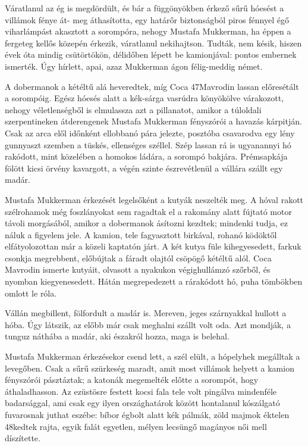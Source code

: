 \documentclass{IEEEtran}
\begin{document}
Váratlanul az ég is megdördült, és bár a függönyökben érkező sűrű hóesést a
villámok fénye át- meg áthasította, egy határőr biztonságból piros fénnyel égő
viharlámpást akasztott a sorompóra, nehogy Mustafa Mukkerman, ha éppen a
fergeteg kellős közepén érkezik, váratlanul nekihajtson. Tudták, nem késik,
hiszen évek óta mindig csütörtökön, délidőben lépett be kamionjával: pontos
embernek ismerték. Úgy hírlett, apai, azaz Mukkerman ágon félig-meddig német.

A dobermanok a kétéltű alá heveredtek, míg Coca 47Mavrodin lassan előresétált
a sorompóig. Egész hóesés alatt a kék-sárga vasrúdra könyökölve várakozott,
nehogy véletlenségből is elmulassza azt a pillanatot, amikor a túloldali
szerpentineken átderengenek Mustafa Mukkerman fényszórói a havazás kárpitján.
Csak az arca elől időnként ellobbanó pára jelezte, posztóba csavarodva egy
lény gunnyaszt szemben a tüskés, ellenséges széllel. Szép lassan rá is
ugyanannyi hó rakódott, mint közelében a homokos ládára, a sorompó bakjára.
Prémsapkája fölött kicsi örvény kavargott, a végén szinte észrevétlenül a
vállára szállt egy madár.

Mustafa Mukkerman érkezését legelsőként a kutyák neszelték meg. A hóval rakott
szélrohamok még foszlányokat sem ragadtak el a rakomány alatt fújtató motor
távoli morgásából, amikor a dobermanok ásítozni kezdtek; mindenki tudja, ez
náluk a figyelem jele. A kamion, tele fagyasztott birkával, rohanó ködöktől
elfátyolozottan már a közeli kaptatón járt. A két kutya füle kihegyesedett,
farkuk csonkja megrebbent, előbújtak a fáradt olajtól csöpögő kétéltű alól.
Coca Mavrodin ismerte kutyáit, olvasott a nyakukon végighullámzó szőrből, és
nyomban kiegyenesedett. Hátán megrepedezett a rárakódott hó, puha tömbökben
omlott le róla.

Vállán megbillent, fölfordult a madár is. Mereven, jeges szárnyakkal hullott a
hóba. Úgy látszik, az előbb már csak meghalni szállt volt oda. Azt mondják, a
tunguz náthába a madár, aki északról hozza, maga is belehal.

Mustafa Mukkerman érkezésekor csend lett, a szél elült, a hópelyhek megálltak
a levegőben. Csak a sűrű szürkeség maradt, amit most villámok helyett a kamion
fényszórói pásztáztak; a katonák megemelték előtte a sorompót, hogy
áthaladhasson. Az ezüstösre festett kocsi fala tele volt pingálva mindenféle
badarsággal, ami csak egy ilyen országhatárok között hontalanul kószálgató
fuvarosnak juthat eszébe: bíbor égbolt alatt kék pálmák, zöld majmok éktelen
48kedtek rajta, egyik falát egyetlen, mélyen lecsüngő magányos női mell
díszítette.
\end{document}
